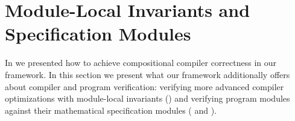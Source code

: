 \chapter{\;\;\;\;Module-Local Invariants and Specification Modules}
\label{sec:overview-modulelocal}

In  we presented how to achieve compositional compiler correctness
in our framework.  In this section we present what our framework additionally offers about compiler and
program verification: verifying more advanced compiler optimizations with module-local
invariants () and verifying program modules against their
mathematical specification modules ( and ).
%
%




